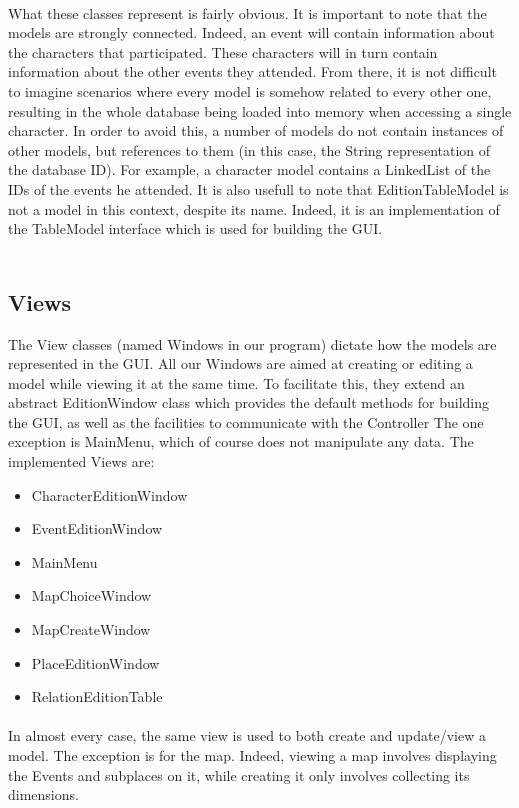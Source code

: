 \documentclass[a4paper ,12pt,french]{article}
\begin{document}
 \paragraph*{} What these classes represent is fairly obvious. It is important to note that the models are strongly connected. Indeed, an event will contain information about the characters that participated. These characters will in turn contain information about the other events they attended. From there, it is not difficult to imagine scenarios where every model is somehow related to every other one, resulting in the whole database being loaded into memory when accessing a single character.
In order to avoid this, a number of models do not contain instances of other models, but references to them (in this case, the String representation of the database ID). For example, a character model contains a LinkedList of the IDs of the events he attended. It is also usefull to note that EditionTableModel is not a model in this context, despite its name. Indeed, it is an implementation of the TableModel interface which is used for building the GUI.\\ \\

\subsection{Views}
The View classes (named Windows in our program) dictate how the models are represented in the GUI. All our Windows are aimed at creating or editing a model while viewing it at the same time. To facilitate this, they extend an abstract EditionWindow class which provides the default methods for building the GUI, as well as the facilities to communicate with the Controller The one exception is MainMenu, which of course does not manipulate any data. The implemented Views are:
\begin{itemize}
\item CharacterEditionWindow
\item EventEditionWindow
\item MainMenu
\item MapChoiceWindow
\item MapCreateWindow
\item PlaceEditionWindow
\item RelationEditionTable
\end{itemize}

\paragraph*{}
In almost every case, the same view is used to both create and update/view a model. The exception is for the map. Indeed, viewing a map involves displaying the Events and subplaces on it, while creating it only involves collecting its dimensions.
\end{document}
